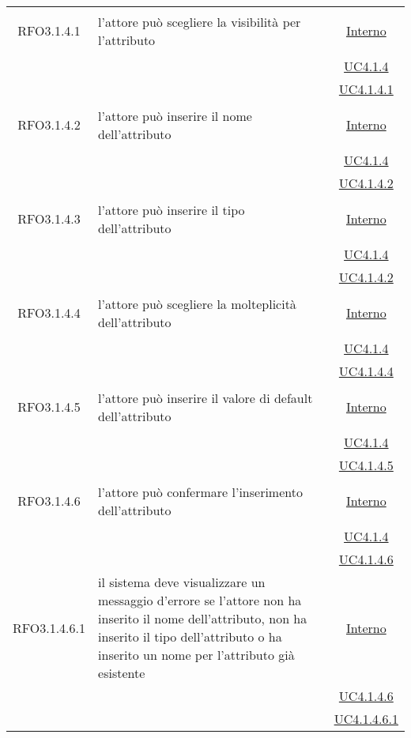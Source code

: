\begin{longtable}{|c|>{\centering}m{7cm}|c|}
\hypertarget{RFO3.1.4.1}{RFO3.1.4.1} & l'attore può scegliere la visibilità per l'attributo &  \hyperlink{Interno}{Interno}\\
& &\hyperref[UC4.1.4]{UC4.1.4}\\
& &\hyperref[UC4.1.4.1]{UC4.1.4.1}\\ \hline

\hypertarget{RFO3.1.4.2}{RFO3.1.4.2} & l'attore può inserire il nome dell'attributo & \hyperlink{Interno}{Interno}\\
& &\hyperref[UC4.1.4]{UC4.1.4}\\
& &\hyperref[UC4.1.4.2]{UC4.1.4.2}\\ \hline

\hypertarget{RFO3.1.4.3}{RFO3.1.4.3} & l'attore può inserire il tipo dell'attributo & \hyperlink{Interno}{Interno}\\
& &\hyperref[UC4.1.4]{UC4.1.4}\\
& &\hyperref[UC4.1.4.2]{UC4.1.4.2}\\ \hline

\hypertarget{RFO3.1.4.4}{RFO3.1.4.4} & l'attore può scegliere la molteplicità dell'attributo & \hyperlink{Interno}{Interno}\\
& &\hyperref[UC4.1.4]{UC4.1.4}\\
& &\hyperref[UC4.1.4.4]{UC4.1.4.4}\\ \hline

\hypertarget{RFO3.1.4.5}{RFO3.1.4.5} & l'attore può inserire il valore di default dell'attributo & \hyperlink{Interno}{Interno}\\
& &\hyperref[UC4.1.4]{UC4.1.4}\\
& &\hyperref[UC4.1.4.5]{UC4.1.4.5}\\ \hline

\hypertarget{RFO3.1.4.6}{RFO3.1.4.6} & l’attore può confermare l'inserimento dell'attributo & \hyperlink{Interno}{Interno}\\
& &\hyperref[UC4.1.4]{UC4.1.4}\\
& &\hyperref[UC4.1.4.6]{UC4.1.4.6}\\ \hline

\hypertarget{RFO3.1.4.6.1}{RFO3.1.4.6.1} & il sistema deve visualizzare un messaggio d’errore se l'attore non ha inserito il nome dell'attributo, non ha inserito il tipo dell'attributo o ha inserito un nome per l'attributo già esistente & \hyperlink{Interno}{Interno}\\
& &\hyperref[UC4.1.4.6]{UC4.1.4.6}\\
& &\hyperref[UC4.1.4.6.1]{UC4.1.4.6.1}\\ \hline


\end{longtable}
